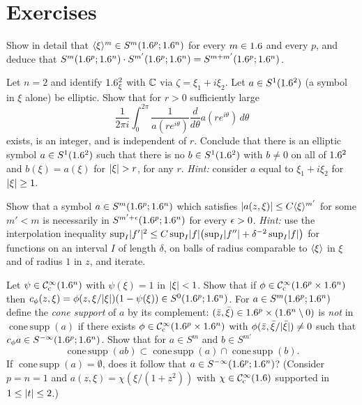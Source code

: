 \section{Exercises}\label{euclidean:sec:exercises}

\begin{exercise}\label{euclidean:ex:japanese}
  Show in detail that $\langle \xi\rangle^m\in S^m(1.6^p;1.6^n)$ for every $m\in1.6$ and
  every $p$, and deduce that
  $S^m(1.6^p;1.6^n)\cdot S^{m'}(1.6^p;1.6^n)=S^{m+m'}(1.6^p;1.6^n)$.
\end{exercise}

\begin{exercise}\label{euclidean:ex:winding}
  Let $n=2$ and identify $1.6^2_\xi$ with $\mathbb{C}$ via $\zeta=\xi_1+i\xi_2$. Let
  $a\in S^1(1.6^2)$ (a symbol in $\xi$ alone) be elliptic. Show that for $r>0$
  sufficiently large
  \begin{equation*}
    \frac1{2\pi i}\int_0^{2\pi}\frac1{a(re^{i\theta})}\frac{d}{d\theta}a(re^{i\theta})\,d\theta
  \end{equation*}
  exists, is an integer, and is independent of $r$. Conclude that there is an
  elliptic symbol $a\in S^1(1.6^2)$ such that there is no $b\in S^1(1.6^2)$
  with $b\ne0$ on all of $1.6^2$ and $b(\xi)=a(\xi)$ for $\lvert \xi\rvert>r$, for any $r$.
  \emph{Hint:} consider $a$ equal to $\xi_1+i\xi_2$ for $\lvert \xi\rvert\ge1$.
\end{exercise}

\begin{exercise}\label{euclidean:ex:interpolation}
  Show that a symbol $a\in S^m(1.6^p;1.6^n)$ which satisfies
  $\lvert a(z,\xi)\rvert\le C\langle \xi\rangle^{m'}$ for some $m'<m$ is necessarily in
  $S^{m'+\epsilon}(1.6^p;1.6^n)$ for every $\epsilon>0$. \emph{Hint:} use the
  interpolation inequality
  $\sup_I\lvert f'\rvert^2\le C\sup_I\lvert f\rvert\bigl(\sup_I\lvert f''\rvert+\delta^{-2}\sup_I\lvert f\rvert\bigr)$
  for functions on an interval $I$ of length $\delta$, on balls of radius
  comparable to $\langle \xi\rangle$ in $\xi$ and of radius $1$ in $z$, and iterate.
\end{exercise}

\begin{exercise}\label{euclidean:ex:cone-support}
  Let $\psi\in\mathcal{C}^\infty_{\mathrm{c}}(1.6^n)$ with $\psi(\xi)=1$ in $\lvert \xi\rvert<1$. Show that if
  $\phi\in\mathcal{C}^\infty_{\mathrm{c}}(1.6^p\times1.6^n)$ then
  $c_\phi(z,\xi)=\phi(z,\xi/\lvert \xi\rvert)(1-\psi(\xi))\in S^0(1.6^p;1.6^n)$. For
  $a\in S^m(1.6^p;1.6^n)$ define the \emph{cone support} of $a$ by its
  complement: $(\bar z,\bar\xi)\in1.6^p\times(1.6^n\setminus0)$ is \emph{not} in
  $\operatorname{cone\,supp}(a)$ if there exists $\phi\in\mathcal{C}^\infty_{\mathrm{c}}(1.6^p\times1.6^n)$
  with $\phi(\bar z,\bar\xi/\lvert \bar\xi\rvert)\ne0$ such that
  $c_\phi a\in S^{-\infty}(1.6^p;1.6^n)$. Show that for $a\in S^m$ and $b\in S^{m'}$
  \begin{equation*}
    \operatorname{cone\,supp}(ab)\subset\operatorname{cone\,supp}(a)\cap
    \operatorname{cone\,supp}(b).
  \end{equation*}
  If $\operatorname{cone\,supp}(a)=\emptyset$, does it follow that
  $a\in S^{-\infty}(1.6^p;1.6^n)$? (Consider $p=n=1$ and
  $a(z,\xi)=\chi(\xi/(1+z^2))$ with $\chi\in\mathcal{C}^\infty_{\mathrm{c}}(1.6)$ supported in
  $1\le\lvert t\rvert\le2$.)
\end{exercise}

